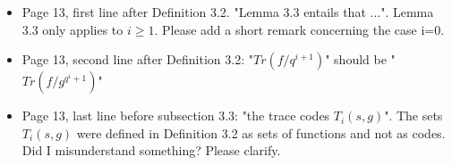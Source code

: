 \documentclass[12pt,a4paper]{amsart}
\begin{document}
\begin{itemize}
\item Page 13, first line after Definition 3.2. "Lemma 3.3 entails that ...". Lemma 3.3 only applies to $i \ge 1$. Please add a short remark concerning the case i=0. 

\item Page 13, second line after Definition 3.2: "$Tr(f/q^{i+1})$" should be "$Tr(f/g^{q^i+1})$"

\item Page 13, last line before subsection 3.3: "the trace codes $T_i(s,g)$". The sets $T_i(s,g)$ were defined in Definition 3.2 as sets of functions and not as codes. Did I misunderstand something? Please clarify.
\end{itemize}
\end{document}
